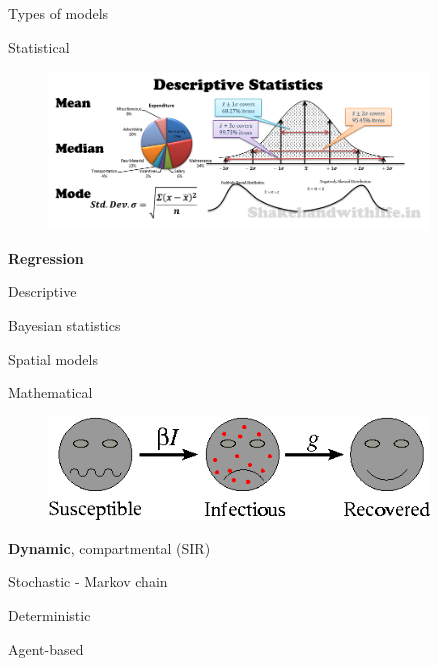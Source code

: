 \documentclass[table]{beamer}\usepackage[]{graphicx}\usepackage[]{color}
\begin{document}
\begin{frame}[fragile]{Types of models}

\begin{block}{Statistical}
\begin{minipage}{.49\textwidth}
\begin{figure}
  \flushleft
  \includegraphics[width=0.9\textwidth,keepaspectratio]{statistics2.png}
\end{figure}
\end{minipage}
\begin{minipage}{.49\textwidth}
\textbf{Regression} \par
\vspace{0.1cm}
Descriptive \par
\vspace{0.1cm}
Bayesian statistics \par
\vspace{0.1cm}
Spatial models
\end{minipage} \hfill
\end{block}
\begin{block}{Mathematical}
\begin{minipage}{.49\textwidth}
\begin{figure}
  \flushleft
  \includegraphics[width=0.9\textwidth,keepaspectratio]{sir2.png}
\end{figure}
\end{minipage} \hfill %
\begin{minipage}{.49\textwidth}
\textbf{Dynamic}, compartmental (SIR) \par %
\vspace{0.1cm}
Stochastic - Markov chain \par
\vspace{0.1cm}
Deterministic \par
\vspace{0.1cm}
Agent-based
\end{minipage}
\end{block}


\end{frame}
\end{document}
